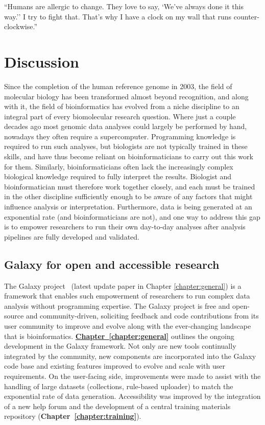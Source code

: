 \begin{savequote}[75mm]
``Humans are allergic to change. They love to say, `We've always done it this way.'' I try to fight that. That's why I have a clock on my wall that runs counter-clockwise.''
\end{savequote}

\chapter{Discussion}\label{discussion}
\setcounter{figure}{-1}
\setcounter{table}{-1}
\setcounter{section}{-1}
\setcounter{NAT@ctr}{-1}

Since the completion of the human reference genome in 2003, the field of molecular biology has been transformed almost beyond recognition, and along with it, the field of bioinformatics has evolved from a niche discipline to an integral part of every biomolecular research question. Where just a couple decades ago most genomic data analyses could largely be performed by hand, nowadays they often require a supercomputer. Programming knowledge is required to run such analyses, but biologists are not typically trained in these skills, and have thus become reliant on bioinformaticians to carry out this work for them. Similarly, bioinformaticians often lack the increasingly complex biological knowledge required to fully interpret the results. Biologist and bioinformatician must therefore work together closely, and each must be trained in the other discipline sufficiently enough to be aware of any factors that might influence analysis or interpretation. Furthermore, data is being generated at an exponential rate (and bioinformaticians are not), and one way to address this gap is to empower researchers to run their own day-to-day analyses after analysis pipelines are fully developed and validated.


\section{Galaxy for open and accessible research}
The Galaxy project~\cite{giardine2005galaxy,blankenberg2010galaxy,afgan2016galaxy} (latest update paper in Chapter \ref{chapter:general}) is a framework that enables such empowerment of researchers to run complex data analysis without programming expertise. The Galaxy project is free and open-source and community-driven, soliciting feedback and code contributions from its user community to improve and evolve along with the ever-changing landscape that is bioinformatics. \hyperref[chapter:galaxy]{\textbf{Chapter~\ref{chapter:general}}} outlines the ongoing development in the Galaxy framework. Not only are new tools continually integrated by the community, new components are incorporated into the Galaxy code base and existing features improved to evolve and scale with user requirements. On the user-facing side, improvements were made to assist with the handling of large datasets (collections, rule-based uploader) to match the exponential rate of data generation. Accessibility was improved by the integration of a new help forum and the development of a central training materials repository (\textbf{Chapter~\ref{chapter:training}}).


